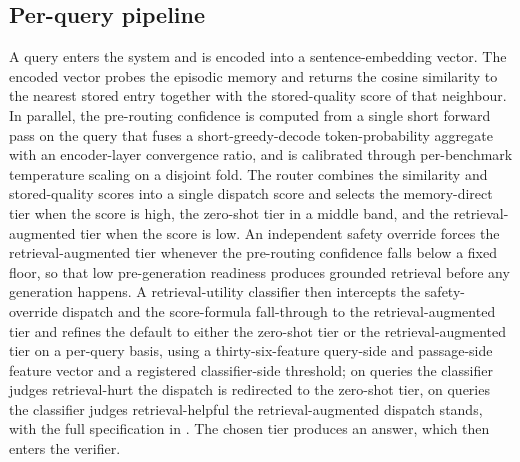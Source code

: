 \subsection{Per-query pipeline}
\label{sec:per-query-pipeline}

A query enters the system and is encoded into a sentence-embedding vector. The encoded vector probes the episodic memory and returns the cosine similarity to the nearest stored entry together with the stored-quality score of that neighbour. In parallel, the pre-routing confidence is computed from a single short forward pass on the query that fuses a short-greedy-decode token-probability aggregate with an encoder-layer convergence ratio, and is calibrated through per-benchmark temperature scaling on a disjoint fold. The router combines the similarity and stored-quality scores into a single dispatch score and selects the memory-direct tier when the score is high, the zero-shot tier in a middle band, and the retrieval-augmented tier when the score is low. An independent safety override forces the retrieval-augmented tier whenever the pre-routing confidence falls below a fixed floor, so that low pre-generation readiness produces grounded retrieval before any generation happens. A retrieval-utility classifier then intercepts the safety-override dispatch and the score-formula fall-through to the retrieval-augmented tier and refines the default to either the zero-shot tier or the retrieval-augmented tier on a per-query basis, using a thirty-six-feature query-side and passage-side feature vector and a registered classifier-side threshold; on queries the classifier judges retrieval-hurt the dispatch is redirected to the zero-shot tier, on queries the classifier judges retrieval-helpful the retrieval-augmented dispatch stands, with the full specification in . The chosen tier produces an answer, which then enters the verifier.

